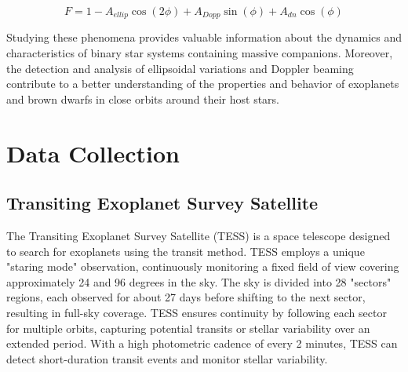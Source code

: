 \documentclass{article}
\begin{document}
\begin{equation}
    F = 1 - A_{ellip}\cos(2\phi) + A_{Dopp}\sin(\phi) + A_{dn}\cos(\phi)
\end{equation}

Studying these phenomena provides valuable information about the dynamics and characteristics of binary star systems containing massive companions. Moreover, the detection and analysis of ellipsoidal variations and Doppler beaming contribute to a better understanding of the properties and behavior of exoplanets and brown dwarfs in close orbits around their host stars.

\section{Data Collection}

\subsection{Transiting Exoplanet Survey Satellite}

The Transiting Exoplanet Survey Satellite (TESS) is a space telescope designed to search for exoplanets using the transit method. TESS employs a unique "staring mode" observation, continuously monitoring a fixed field of view covering approximately 24 and 96 degrees in the sky. The sky is divided into 28 "sectors" regions, each observed for about 27 days before shifting to the next sector, resulting in full-sky coverage. TESS ensures continuity by following each sector for multiple orbits, capturing potential transits or stellar variability over an extended period. With a high photometric cadence of every 2 minutes, TESS can detect short-duration transit events and monitor stellar variability.
\end{document}
